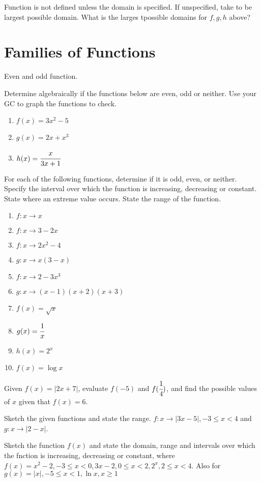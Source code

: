 \documentclass[letterpaper]{article}
\begin{document}
\begin{enumerate}
Function is not defined unless the domain is specified. If unspecified, take to be largest possible domain. What is the larges tpossible domains for $f, g, h$ above?

\section{Families of Functions}

Even and odd function. 

Determine algebraically if the functions below are even, odd or neither. Use your GC to graph the functions to check.

\begin{enumerate}
\item $f(x) = 3x^2 - 5$
\item $g(x) = 2x+ x^3$
\item $h(x) = \cfrac{x}{3x + 1}$
\end{enumerate}

For each of the following functions, determine if it is odd, even, or neither. Specify the interval over which the function is increasing, decreasing or constant. State where an extreme value occurs. State the range of the function.

\begin{enumerate}
\item $f: x \to x$
\item $f: x \to 3 - 2x$
\item $f: x \to 2x^2 - 4$
\item $g: x \to x(3-x)$
\item $f: x \to 2 - 3x^3$
\item $g: x \to (x-1)(x+2)(x+3)$
\item $f(x) = \sqrt{x}$
\item $g(x) = \cfrac{1}{x}$
\item $h(x) = 2^x$
\item $f(x) = \log x$
\end{enumerate}

Given $f(x) = |2x + 7|$, evaluate $f(-5)$ and $f(\cfrac{1}{4})$, and find the possible values of $x$ given that $f(x) = 6$.

Sketch the given functions and state the range. $f: x \to |3x - 5|, -3 \le x < 4$ and $g: x \to |2 - x|$.

Sketch the function $f(x)$ and state the domain, range and intervals over which the fnction is increasing, decreasing or constant, where $f(x) = x^2 - 2, -3 \le x < 0, 3x - 2, 0 \le x < 2, 2^x, 2 \le x < 4$. Also for $g(x) = |x|, -5 \le x < 1, \ln x, x \ge 1$


\end{enumerate}
\end{document}
